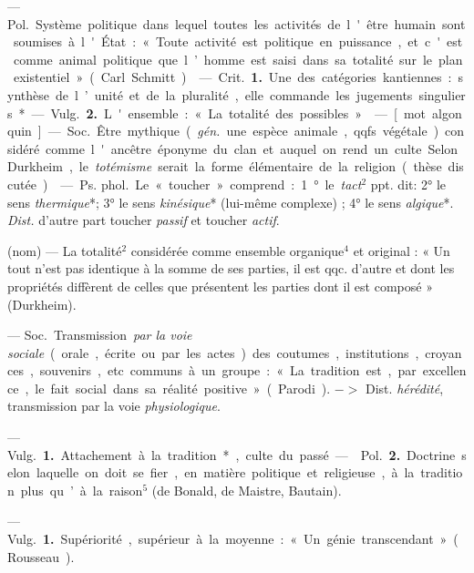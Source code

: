 \begin{itemize}[leftmargin=1cm, label=, itemsep=1pt]
 — \si{Pol.} Système politique dans lequel toutes les
activités de l'être humain sont soumises à l'État : « Toute activité est
politique en puissance, et c'est comme animal politique que l’homme est saisi
dans sa totalité sur le plan existentiel » (Carl Schmitt).

 — \si{Crit.} {\bf 1.} Une des catégories kantiennes : synthèse
de l’unité et de la pluralité, elle commande les jugements singuliers*.

— \si{Vulg.} {\bf 2.} L'ensemble : « La totalité des possibles. »

 — [mot algonquin] — \si{Soc.} Être mythique ({\it gén.} une espèce
animale, qqfs. végétale) considéré comme l'ancêtre éponyme du clan et auquel
on rend un culte. Selon Durkheim, le {\it totémisme} serait la forme
élémentaire de la religion (thèse discutée).

 — \si{Ps. phol.} Le « toucher » comprend : 1° le {\it tact}$^2$
ppt. dit: 2° le sens {\it thermique}*; 3° le sens {\it kinésique}* (lui-même
complexe) ; 4° le sens {\it algique}*. {\it Dist.} d'autre part toucher {\it
passif} et toucher {\it actif}.

 (nom) — La totalité$^2$ considérée comme ensemble organique$^4$ et
original : « Un tout n’est pas identique à la somme de ses parties, il est
qqc. d’autre et dont les propriétés diffèrent de celles que présentent les
parties dont il est composé » (Durkheim).

 — \si{Soc.} Transmission {\it par la voie sociale} (orale,
écrite ou par les actes) des coutumes, institutions, croyances, souvenirs,
etc. communs à un groupe : « La tradition est, par excellence, le fait social
dans sa réalité positive » (Parodi). $->$ Dist. {\it hérédité}, transmission
par la voie {\it physiologique}.

 —  \si{Vulg.} {\bf 1.} Attachement à la
tradition*, culte du passé. —  \si{Pol.} {\bf 2.} Doctrine
selon laquelle on doit se fier, en matière politique et religieuse, à la
tradition plus qu’à la raison$^5$ (de Bonald, de Maistre, Bautain).

 — \si{Vulg.} {\bf 1.} Supériorité, supérieur
à la moyenne : « Un génie transcendant » (Rousseau).


\end{itemize}
